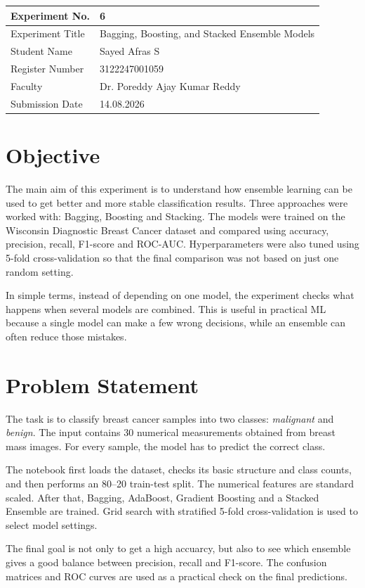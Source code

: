 \documentclass[12pt,a4paper]{article}
\begin{document}
\begin{tabular}{|p{4cm}|p{11cm}|}
\hline
Experiment No. & 6 \\ \hline
Experiment Title & Bagging, Boosting, and Stacked Ensemble Models \\ \hline
Student Name & Sayed Afras S \\ \hline
Register Number & 3122247001059 \\ \hline
Faculty & Dr. Poreddy Ajay Kumar Reddy \\ \hline
Submission Date & 14.08.2026 \\ \hline
\end{tabular}

\section{Objective}
The main aim of this experiment is to understand how ensemble learning can be used to get better and more stable classification results. Three approaches were worked with: Bagging, Boosting and Stacking. The models were trained on the Wisconsin Diagnostic Breast Cancer dataset and compared using accuracy, precision, recall, F1-score and ROC-AUC. Hyperparameters were also tuned using 5-fold cross-validation so that the final comparison was not based on just one random setting.

In simple terms, instead of depending on one model, the experiment checks what happens when several models are combined. This is useful in practical ML because a single model can make a few wrong decisions, while an ensemble can often reduce those mistakes.

\section{Problem Statement}
The task is to classify breast cancer samples into two classes: \textit{malignant} and \textit{benign}. The input contains 30 numerical measurements obtained from breast mass images. For every sample, the model has to predict the correct class.

The notebook first loads the dataset, checks its basic structure and class counts, and then performs an 80--20 train-test split. The numerical features are standard scaled. After that, Bagging, AdaBoost, Gradient Boosting and a Stacked Ensemble are trained. Grid search with stratified 5-fold cross-validation is used to select model settings.

The final goal is not only to get a high accuarcy, but also to see which ensemble gives a good balance between precision, recall and F1-score. The confusion matrices and ROC curves are used as a practical check on the final predictions.
\end{document}
